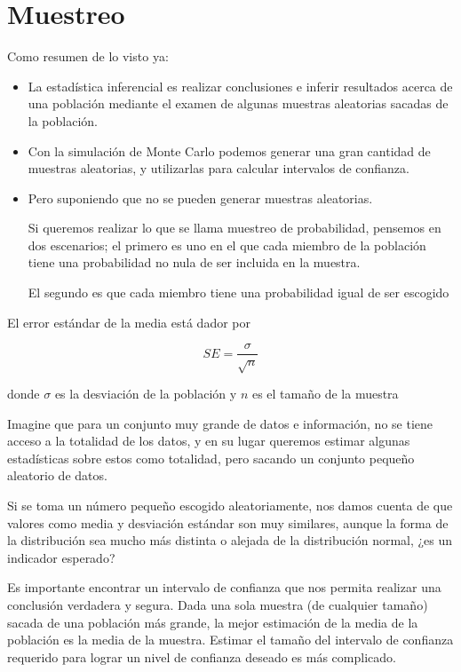 \section{Muestreo}

Como resumen de lo visto ya:

\begin{itemize}
    \item La estadística inferencial es realizar conclusiones e inferir resultados acerca de una población mediante el examen de algunas muestras aleatorias sacadas de la población.
    \item Con la simulación de Monte Carlo podemos generar una gran cantidad de muestras aleatorias, y utilizarlas para calcular intervalos de confianza.
    \item Pero suponiendo que no se pueden generar muestras aleatorias. 
    
    Si queremos realizar lo que se llama muestreo de probabilidad, pensemos en dos escenarios; el primero es uno en el que cada miembro de la población tiene una probabilidad no nula de ser incluida en la muestra.
    
    El segundo es que cada miembro tiene una probabilidad igual de ser escogido
    
\end{itemize}

El error estándar de la media está dador por 

\begin{equation}
    SE = \frac{\sigma}{\sqrt{n}}
\end{equation}

donde $\sigma$ es la desviación de la población y $n$ es el tamaño de la muestra

Imagine que para un conjunto muy grande de datos e información, no se tiene acceso a la totalidad de los datos, y en su lugar queremos estimar algunas estadísticas sobre estos como totalidad, pero sacando un conjunto pequeño aleatorio de datos.

Si se toma un número pequeño escogido aleatoriamente, nos damos cuenta de que valores como media y desviación estándar son muy similares, aunque la forma de la distribución sea mucho más distinta o alejada de la distribución normal, ¿es un indicador esperado?

Es importante encontrar un intervalo de confianza que nos permita realizar una conclusión verdadera y segura. Dada una sola muestra (de cualquier tamaño) sacada de una población más grande, la mejor estimación de la media de la población es la media de la muestra. Estimar el tamaño del intervalo de confianza requerido para lograr un nivel de confianza deseado es más complicado.

